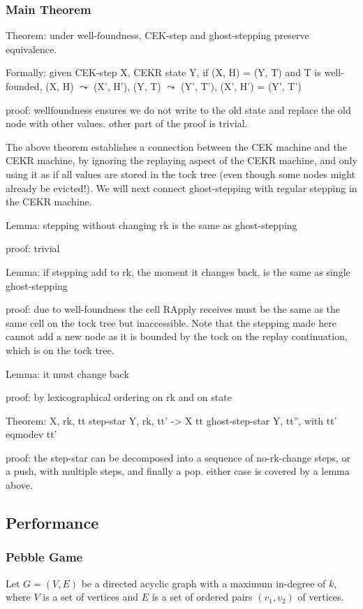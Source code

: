 \subsubsection{Main Theorem}
Theorem: under well-foundness, CEK-step and ghost-stepping preserve equivalence.

Formally: given CEK-step X, CEKR state Y, if (X, H) = (Y, T) and T is well-founded, (X, H) $\leadsto$ (X', H'), (Y, T) $\leadsto$ (Y', T'), (X', H') = (Y', T')

proof: wellfoundness ensures we do not write to the old state and replace the old node with other values. other part of the proof is trivial.

The above theorem establishes a connection between the CEK machine and the CEKR machine, by ignoring the replaying aspect of the CEKR machine, and only using it as if all values are stored in the tock tree (even though some nodes might already be evicted!). We will next connect ghost-stepping with regular stepping in the CEKR machine.

Lemma: stepping without changing rk is the same as ghost-stepping

proof: trivial

Lemma: if stepping add to rk, the moment it changes back, is the same as single ghost-stepping

proof: due to well-foundness the cell RApply receives must be the same as the same cell on the tock tree but inaccessible. Note that the stepping made here cannot add a new node as it is bounded by the tock on the replay continuation, which is on the tock tree.

Lemma: it must change back

proof: by lexicographical ordering on rk and on state

Theorem: X, rk, tt step-star Y, rk, tt' -> X tt ghost-step-star Y, tt'', with tt' eqmodev tt'

proof: the step-star can be decomposed into a sequence of no-rk-change steps, or a push, with multiple steps, and finally a pop. either case is covered by a lemma above.

\subsection{Performance}
\subsubsection{Pebble Game}


Let $G=(V,E)$ be a directed acyclic graph with a maximum in-degree of $k$, where $V$ is a set of vertices and $E$ is a set of ordered pairs $(v_1, v_2)$ of vertices.

